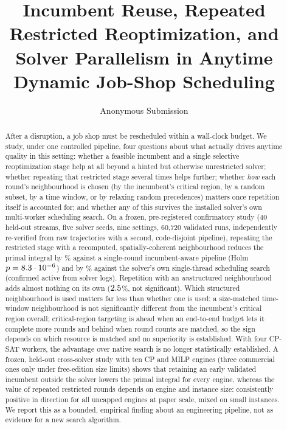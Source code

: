 \documentclass[letterpaper]{article} %
\title{Incumbent Reuse, Repeated Restricted Reoptimization, and Solver Parallelism in Anytime Dynamic Job-Shop Scheduling}
\author{
    Anonymous Submission
}
\begin{document}
\maketitle

\begin{abstract}
After a disruption, a job shop must be rescheduled within a wall-clock budget. We study, under one controlled pipeline, four questions about what actually drives anytime quality in this setting: whether a feasible incumbent and a single selective reoptimization stage help at all beyond a hinted but otherwise unrestricted solver; whether repeating that restricted stage several times helps further; whether \emph{how} each round's neighbourhood is chosen (by the incumbent's critical region, by a random subset, by a time window, or by relaxing random precedences) matters once repetition itself is accounted for; and whether any of this survives the installed solver's own multi-worker scheduling search. On a frozen, pre-registered confirmatory study (40 held-out streams, five solver seeds, nine settings, 60{,}720 validated runs, independently re-verified from raw trajectories with a second, code-disjoint pipeline), repeating the restricted stage with a recomputed, spatially-coherent neighbourhood reduces the primal integral by \UOneBTwocritVsBZeroiaipRel\% against a single-round incumbent-aware pipeline (Holm $p=8.3\cdot10^{-6}$) and by \UOneBTwocritVsBFivenativeOnewRel\% against the solver's own single-thread scheduling search (confirmed active from solver logs). Repetition with an \emph{un}structured neighbourhood adds almost nothing on its own ($2.5$\%, not significant). Which structured neighbourhood is used matters far less than whether one is used: a size-matched time-window neighbourhood is not significantly different from the incumbent's critical region overall; critical-region targeting is ahead when an end-to-end budget lets it complete more rounds and behind when round counts are matched, so the sign depends on which resource is matched and no superiority is established. With four CP-SAT workers, the advantage over native search is no longer statistically established. A frozen, held-out cross-solver study with ten CP and MILP engines (three commercial ones only under free-edition size limits) shows that retaining an early validated incumbent outside the solver lowers the primal integral for every engine, whereas the value of repeated restricted rounds depends on engine and instance size: consistently positive in direction for all uncapped engines at paper scale, mixed on small instances. We report this as a bounded, empirical finding about an engineering pipeline, not as evidence for a new search algorithm.
\end{abstract}
\end{document}
